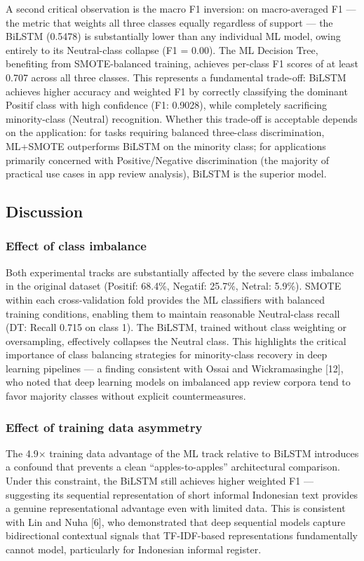 \documentclass{article}
\begin{document}
A second critical observation is the macro F1 inversion: on macro-averaged F1 --- the metric that weights all three classes equally regardless of support --- the BiLSTM (0.5478) is substantially lower than any individual ML model, owing entirely to its Neutral-class collapse (F1 = 0.00). The ML Decision Tree, benefiting from SMOTE-balanced training, achieves per-class F1 scores of at least 0.707 across all three classes. This represents a fundamental trade-off: BiLSTM achieves higher accuracy and weighted F1 by correctly classifying the dominant Positif class with high confidence (F1: 0.9028), while completely sacrificing minority-class (Neutral) recognition. Whether this trade-off is acceptable depends on the application: for tasks requiring balanced three-class discrimination, ML+SMOTE outperforms BiLSTM on the minority class; for applications primarily concerned with Positive/Negative discrimination (the majority of practical use cases in app review analysis), BiLSTM is the superior model.

\subsection{Discussion}

\subsubsection*{Effect of class imbalance}
Both experimental tracks are substantially affected by the severe class imbalance in the original dataset (Positif: 68.4\%, Negatif: 25.7\%, Netral: 5.9\%). SMOTE within each cross-validation fold provides the ML classifiers with balanced training conditions, enabling them to maintain reasonable Neutral-class recall (DT: Recall 0.715 on class 1). The BiLSTM, trained without class weighting or oversampling, effectively collapses the Neutral class. This highlights the critical importance of class balancing strategies for minority-class recovery in deep learning pipelines --- a finding consistent with Ossai and Wickramasinghe [12], who noted that deep learning models on imbalanced app review corpora tend to favor majority classes without explicit countermeasures.

\subsubsection*{Effect of training data asymmetry}
The 4.9$\times$ training data advantage of the ML track relative to BiLSTM introduces a confound that prevents a clean ``apples-to-apples'' architectural comparison. Under this constraint, the BiLSTM still achieves higher weighted F1 --- suggesting its sequential representation of short informal Indonesian text provides a genuine representational advantage even with limited data. This is consistent with Lin and Nuha [6], who demonstrated that deep sequential models capture bidirectional contextual signals that TF-IDF-based representations fundamentally cannot model, particularly for Indonesian informal register.
\end{document}

